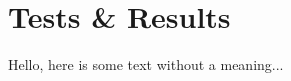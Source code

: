 \documentclass[../main.tex]{subfiles}
\begin{document}
\section{Tests \& Results}
Hello, here is some text without a meaning...
\end{document}
